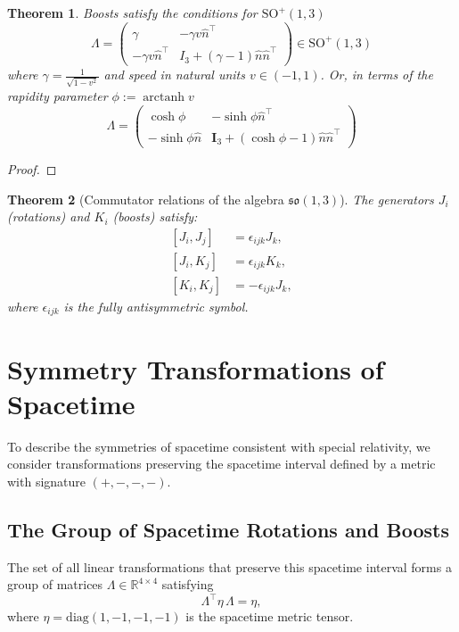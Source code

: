 \documentclass{amsart}
\newtheorem{theorem}{Theorem}[section]
\theoremstyle{remark}
\DeclareMathOperator{\arctanh}{arctanh}
\begin{document}
\begin{theorem}
  Boosts satisfy the conditions for $\mathrm{SO}^+(1,3)$
  \[
  \Lambda =
  \begin{pmatrix}
    \gamma & -\gamma v \hat{n}^\top \\
    -\gamma v \hat{n}^\top & I_3 + \left(\gamma-1\right)\hat{n}\hat{n}^\top
  \end{pmatrix} \in \mathrm{SO}^+(1,3)
  \]
  where $\gamma=\frac{1}{\sqrt{1-v^2}}$ and \emph{speed} in natural units $v\in(-1,1)$. Or, in terms of the \emph{rapidity} parameter $\phi:=\arctanh v$
  \[
  \Lambda =
  \begin{pmatrix}
    \cosh \phi & -\sinh \phi \hat{n}^\top \\
    -\sinh \phi \hat{n} & \mathbf{I}_3 + (\cosh \phi - 1) \hat{n} \hat{n}^\top
  \end{pmatrix}
  \]
\end{theorem}
\begin{proof}
\end{proof}
\begin{theorem}[Commutator relations of the algebra $\mathfrak{so}(1,3)$]
  The generators $J_i$ (rotations) and $K_i$ (boosts) satisfy:
  \[
  \begin{aligned}
    [J_i, J_j] &= \epsilon_{ijk} J_k, \\
    [J_i, K_j] &= \epsilon_{ijk} K_k, \\
    [K_i, K_j] &= -\epsilon_{ijk} J_k,
  \end{aligned}
  \]
  where $\epsilon_{ijk}$ is the fully antisymmetric symbol.
\end{theorem}


\section{Symmetry Transformations of Spacetime}
\label{sec:spacetime}

To describe the symmetries of spacetime consistent with special relativity, we consider transformations preserving the spacetime interval defined by a metric with signature \((+,-,-,-)\).

\subsection{The Group of Spacetime Rotations and Boosts}

The set of all linear transformations that preserve this spacetime interval forms a group of matrices \( \Lambda \in \mathbb{R}^{4 \times 4} \) satisfying
\[
\Lambda^\top \eta \, \Lambda = \eta,
\]
where \(\eta = \mathrm{diag}(1, -1, -1, -1)\) is the spacetime metric tensor.
\end{document}
